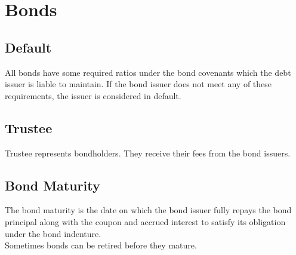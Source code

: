 \chapter{Bonds}

\section{Default}
All bonds have some required ratios under the bond covenants which the debt issuer is liable to maintain. If the bond issuer does not meet any of these requirements, the issuer is considered in default.

\section{Trustee}
Trustee represents bondholders. They receive their fees from the bond issuers.

\section{Bond Maturity}
The bond maturity is the date on which the bond issuer fully repays the bond principal along with the coupon and accrued interest to satisfy its obligation under the bond indenture.\\
Sometimes bonds can be retired before they mature.

